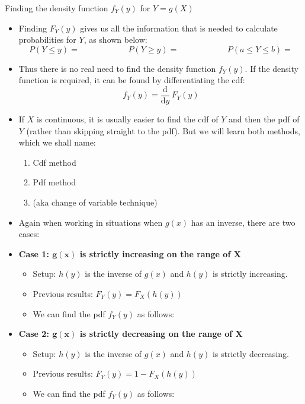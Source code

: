 \documentclass{article}
\newcommand{\ddx}[1]{\frac{\mathrm{d}}{\mathrm{d} #1}\,}		%
\begin{document}
\newpage

Finding the density function $f_Y(y)$ for $Y = g(X)$\bigskip
\begin{itemize}
    \item Finding $F_Y(y)$ gives us all the information that is needed to calculate probabilities for $Y$, as shown below:
    \[P(Y \le y) = \hspace{70pt} P(Y \ge y) = \hspace{70pt} P(a \le Y \le b) = \]
    \item[] Thus there is no real need to find the density function $f_Y(y)$. If the density function is required, it can be found by differentiating the cdf:
    \[f_Y(y) = \ddx{y} F_Y(y)\]
    \item If $X$ is continuous, it is usually easier to find the cdf of $Y$ and then the pdf of $Y$ (rather than skipping straight to the pdf). But we will learn both methods, which we shall name:\smallskip
    \begin{enumerate}
        \item Cdf method
        \item Pdf method
        \item[] (aka change of variable technique)
    \end{enumerate}\bigskip
    \item Again when working in situations when $g(x)$ has an inverse, there are two cases:
        \item \textbf{Case 1: $\boldsymbol{g(x)}$ is strictly increasing on the range of $\boldsymbol{X}$}
        \begin{itemize}
            \item Setup: $h(y)$ is the inverse of $g(x)$ and $h(y)$ is strictly increasing.
            \item Previous results: $F_Y(y) = F_X(h(y))$
            \item We can find the pdf $f_Y(y)$ as follows:\vspace{65pt}
    \end{itemize}
    \item \textbf{Case 2: $\boldsymbol{g(x)}$ is strictly decreasing on the range of $\boldsymbol{X}$}
    \begin{itemize}
        \item Setup: $h(y)$ is the inverse of $g(x)$ and $h(y)$ is strictly decreasing.
        \item Previous results: $F_Y(y) = 1 - F_X(h(y))$
        \item We can find the pdf $f_Y(y)$ as follows:\vspace{65pt}

\end{itemize}
\end{itemize}
\end{document}
